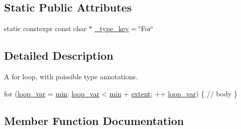 \subsection*{Static Public Attributes}
\begin{DoxyCompactItemize}
\item 
static constexpr const char $\ast$ \hyperlink{classtvm_1_1tir_1_1ForNode_a760906dd7bcaf7328aa284499471447d}{\+\_\+type\+\_\+key} = \char`\"{}For\char`\"{}
\end{DoxyCompactItemize}


\subsection{Detailed Description}
A for loop, with poissible type annotations. 


\begin{DoxyCode}
\textcolor{keywordflow}{for} (\hyperlink{classtvm_1_1tir_1_1ForNode_a7dbf66bdcf8ed397321517f0915a0946}{loop\_var} = \hyperlink{classtvm_1_1tir_1_1ForNode_a1d1aa2006328bd84e4911f6d43ceca5c}{min}; \hyperlink{classtvm_1_1tir_1_1ForNode_a7dbf66bdcf8ed397321517f0915a0946}{loop\_var} < \hyperlink{classtvm_1_1tir_1_1ForNode_a1d1aa2006328bd84e4911f6d43ceca5c}{min} + \hyperlink{classtvm_1_1tir_1_1ForNode_ab54798257255b682a1aad74cec33e070}{extent}; ++
      \hyperlink{classtvm_1_1tir_1_1ForNode_a7dbf66bdcf8ed397321517f0915a0946}{loop\_var}) \{
  \textcolor{comment}{// body}
\}
\end{DoxyCode}
 

\subsection{Member Function Documentation}
